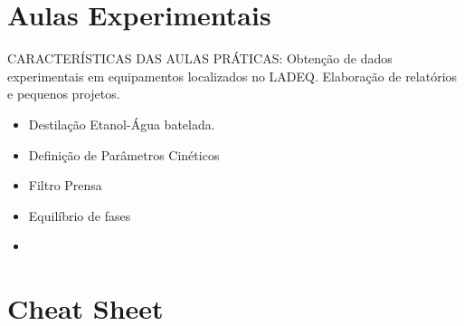 \section{Aulas Experimentais}

CARACTERÍSTICAS DAS AULAS PRÁTICAS: Obtenção de dados experimentais em equipamentos localizados no LADEQ. Elaboração de relatórios e pequenos projetos.

\begin{itemize}
	\item Destilação Etanol-Água batelada.
	\item Definição de Parâmetros Cinéticos
	\item Filtro Prensa
	\item Equilíbrio de fases
	\item 
\end{itemize}

\section{Cheat Sheet}
